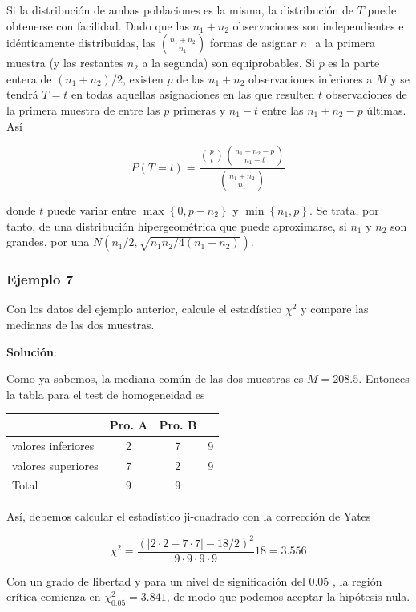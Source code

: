 \documentclass[
]{article}
\begin{document}
Si la distribución de ambas poblaciones es la misma, la distribución de \(T\) puede obtenerse con facilidad. Dado que las \(n_{1}+n_{2}\) observaciones son independientes
e idénticamente distribuidas, las \(\binom{n_{1}+n_{2}}{n_{1}}\) formas de asignar \(n_{1}\) a la primera muestra (y las restantes \(n_{2}\) a la segunda) son equiprobables. Si \(p\) es la parte entera de \(\left(n_{1}+n_{2}\right) / 2\), existen \(p\) de las \(n_{1}+n_{2}\) observaciones inferiores a \(M\) y se tendrá \(T=t\) en todas aquellas asignaciones en las que resulten \(t\) observaciones de la primera muestra de entre las \(p\) primeras y \(n_{1}-t\) entre las \(n_{1}+n_{2}-p\) últimas. Así

\[
P(T=t)=\frac{\binom{p}{t}\binom{n_{1}+n_{2}-p}{n_{1}-t}}{\binom{n_{1}+n_{2}}{n_{1}}}
\]

donde \(t\) puede variar entre \(\max \left\{0, p-n_{2}\right\}\) y \(\min \left\{n_{1}, p\right\}\). Se trata, por tanto, de una distribución hipergeométrica que puede aproximarse, si \(n_{1}\) y \(n_{2}\) son grandes, por una \(N\left(n_{1} / 2, \sqrt{n_{1} n_{2} / 4\left(n_{1}+n_{2}\right)}\right)\).

\subsubsection{Ejemplo 7}\label{ejemplo-7-1}

Con los datos del ejemplo anterior, calcule el estadístico \(\chi^{2}\) y compare las medianas de las dos muestras.

\textbf{Solución}:

Como ya sabemos, la mediana común de las dos muestras es \(M=208.5\). Entonces la tabla para el test de homogeneidad es

\begin{longtable}[]{@{}lccc@{}}
\toprule\noalign{}
& Pro. A & Pro. B & \\
\midrule\noalign{}
\endhead
\bottomrule\noalign{}
\endlastfoot
valores inferiores & 2 & 7 & 9 \\
valores superiores & 7 & 2 & 9 \\
Total & 9 & 9 & \\
\end{longtable}

Así, debemos calcular el estadístico ji-cuadrado con la corrección de Yates

\[
\chi^{2}=\frac{(|2 \cdot 2-7 \cdot 7|-18 / 2)^{2}}{9 \cdot 9 \cdot 9 \cdot 9} 18=3.556
\]

Con un grado de libertad y para un nivel de significación del 0.05 , la región crítica comienza en \(\chi_{0.05}^{2}=3.841\), de modo que podemos aceptar la hipótesis nula.
\end{document}
